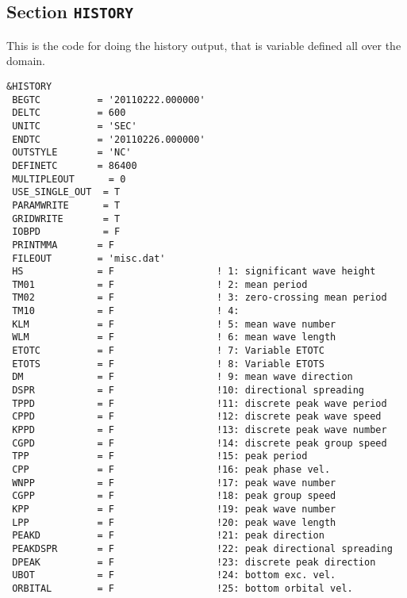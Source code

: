 \documentclass[12pt]{amsart}
\begin{document}
\begin{enumerate}
\begin{itemize}
  \end{itemize}
  



    
\end{enumerate}




\subsection{Section {\tt HISTORY}}
This is the code for doing the history output, that is variable defined all over the domain.
\begin{verbatim}
&HISTORY
 BEGTC          = '20110222.000000'
 DELTC          = 600          
 UNITC          = 'SEC'        
 ENDTC          = '20110226.000000'
 OUTSTYLE       = 'NC'       
 DEFINETC       = 86400      
 MULTIPLEOUT      = 0        
 USE_SINGLE_OUT  = T         
 PARAMWRITE      = T       
 GRIDWRITE       = T       
 IOBPD           = F       
 PRINTMMA       = F        
 FILEOUT        = 'misc.dat'
 HS             = F                  ! 1: significant wave height
 TM01           = F                  ! 2: mean period
 TM02           = F                  ! 3: zero-crossing mean period
 TM10           = F                  ! 4: 
 KLM            = F                  ! 5: mean wave number
 WLM            = F                  ! 6: mean wave length
 ETOTC          = F                  ! 7: Variable ETOTC
 ETOTS          = F                  ! 8: Variable ETOTS
 DM             = F                  ! 9: mean wave direction
 DSPR           = F                  !10: directional spreading
 TPPD           = F                  !11: discrete peak wave period
 CPPD           = F                  !12: discrete peak wave speed
 KPPD           = F                  !13: discrete peak wave number
 CGPD           = F                  !14: discrete peak group speed
 TPP            = F                  !15: peak period  
 CPP            = F                  !16: peak phase vel. 
 WNPP           = F                  !17: peak wave number
 CGPP           = F                  !18: peak group speed
 KPP            = F                  !19: peak wave number
 LPP            = F                  !20: peak wave length 
 PEAKD          = F                  !21: peak direction
 PEAKDSPR       = F                  !22: peak directional spreading
 DPEAK          = F                  !23: discrete peak direction 
 UBOT           = F                  !24: bottom exc. vel. 
 ORBITAL        = F                  !25: bottom orbital vel. 

\end{verbatim}
\end{document}
